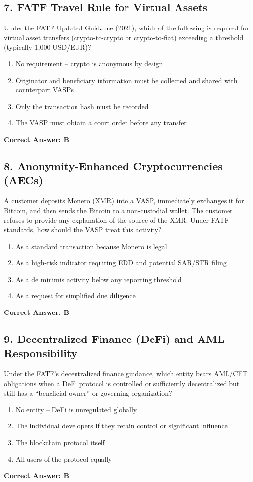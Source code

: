 \documentclass[11pt,a4paper]{article}
\begin{document}
	\subsection{7. FATF Travel Rule for Virtual Assets}
	Under the FATF Updated Guidance (2021), which of the following is required for virtual asset transfers (crypto-to-crypto or crypto-to-fiat) exceeding a threshold (typically 1,000 USD/EUR)?
	\begin{enumerate}[label=\Alph*.]
		\item No requirement – crypto is anonymous by design
		\item Originator and beneficiary information must be collected and shared with counterpart VASPs
		\item Only the transaction hash must be recorded
		\item The VASP must obtain a court order before any transfer
	\end{enumerate}
	\textbf{Correct Answer: B}
	
	\subsection{8. Anonymity-Enhanced Cryptocurrencies (AECs)}
	A customer deposits Monero (XMR) into a VASP, immediately exchanges it for Bitcoin, and then sends the Bitcoin to a non-custodial wallet. The customer refuses to provide any explanation of the source of the XMR. Under FATF standards, how should the VASP treat this activity?
	\begin{enumerate}[label=\Alph*.]
		\item As a standard transaction because Monero is legal
		\item As a high-risk indicator requiring EDD and potential SAR/STR filing
		\item As a de minimis activity below any reporting threshold
		\item As a request for simplified due diligence
	\end{enumerate}
	\textbf{Correct Answer: B}
	
	\subsection{9. Decentralized Finance (DeFi) and AML Responsibility}
	Under the FATF’s decentralized finance guidance, which entity bears AML/CFT obligations when a DeFi protocol is controlled or sufficiently decentralized but still has a “beneficial owner” or governing organization?
	\begin{enumerate}[label=\Alph*.]
		\item No entity – DeFi is unregulated globally
		\item The individual developers if they retain control or significant influence
		\item The blockchain protocol itself
		\item All users of the protocol equally
	\end{enumerate}
	\textbf{Correct Answer: B}
	
\end{document}
